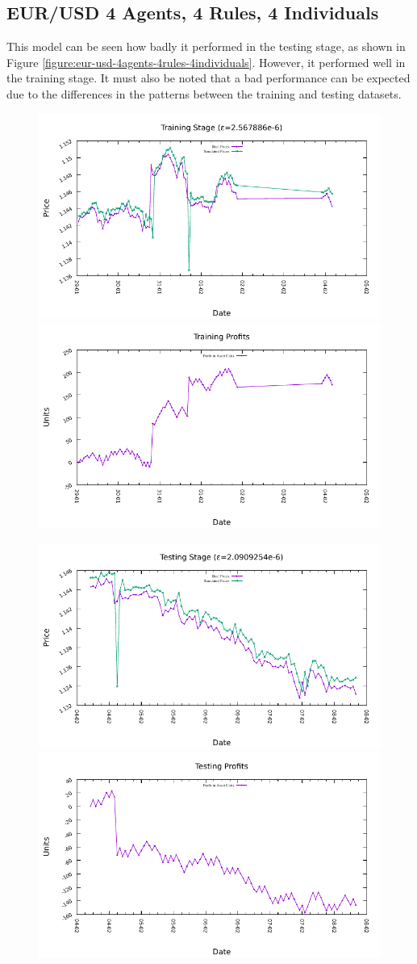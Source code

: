 \newpage

\subsection{EUR/USD 4 Agents, 4 Rules, 4 Individuals}
\label{results:forecast-eur-usd-4agents-4rules-4individuals}

This model can be seen how badly it performed in the testing stage, as shown in Figure \ref{figure:eur-usd-4agents-4rules-4individuals}. However, it performed well in the training stage. It must also be noted that a bad performance can be expected due to the differences in the patterns between the training and testing datasets.

\begin{figure}[htp]
  \centering

  \includegraphics[width=.45\textwidth]{img/plots/eur_usd_h1-4agents-4rules-4ind-100gen_training_fit.pdf}\quad
  \includegraphics[width=.45\textwidth]{img/plots/eur_usd_h1-4agents-4rules-4ind-100gen_training_profits.pdf}

  \medskip

  \includegraphics[width=.45\textwidth]{img/plots/eur_usd_h1-4agents-4rules-4ind-100gen_testing_fit.pdf}\quad
  \includegraphics[width=.45\textwidth]{img/plots/eur_usd_h1-4agents-4rules-4ind-100gen_testing_profits.pdf}


\end{figure}

